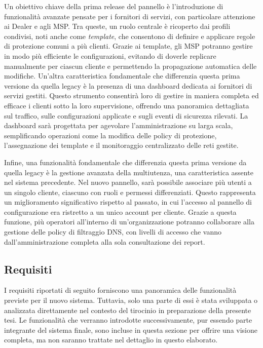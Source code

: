 Un obiettivo chiave della prima release del pannello è l'introduzione di funzionalità avanzate pensate per i fornitori di servizi, con particolare attenzione ai Dealer e agli MSP. Tra queste, un ruolo centrale è ricoperto dai profili condivisi, noti anche come \textit{template}, che consentono di definire e applicare regole di protezione comuni a più clienti. Grazie ai template, gli MSP potranno gestire in modo più efficiente le configurazioni, evitando di doverle replicare manualmente per ciascun cliente e permettendo la propagazione automatica delle modifiche.
%
Un'altra caratteristica fondamentale che differenzia questa prima versione da quella legacy è la presenza di una dashboard dedicata ai fornitori di servizi gestiti. Questo strumento consentirà loro di gestire in maniera completa ed efficace i clienti sotto la loro supervisione, offrendo una panoramica dettagliata sul traffico, sulle configurazioni applicate e sugli eventi di sicurezza rilevati. La dashboard sarà progettata per agevolare l’amministrazione su larga scala, semplificando operazioni come la modifica delle policy di protezione, l'assegnazione dei template e il monitoraggio centralizzato delle reti gestite.

Infine, una funzionalità fondamentale che differenzia questa prima versione da quella legacy è la gestione avanzata della multiutenza, una caratteristica assente nel sistema precedente. Nel nuovo pannello, sarà possibile associare più utenti a un singolo cliente, ciascuno con ruoli e permessi differenziati. Questo rappresenta un miglioramento significativo rispetto al passato, in cui l’accesso al pannello di configurazione era ristretto a un unico account per cliente. Grazie a questa funzione, più operatori all'interno di un'organizzazione potranno collaborare alla gestione delle policy di filtraggio DNS, con livelli di accesso che vanno dall'amministrazione completa alla sola consultazione dei report.

\subsection{Requisiti}
I requisiti riportati di seguito forniscono una panoramica delle funzionalità previste per il nuovo sistema. Tuttavia, solo una parte di essi è stata sviluppata o analizzata direttamente nel contesto del tirocinio in preparazione della presente tesi. Le funzionalità che verranno introdotte successivamente, pur essendo parte integrante del sistema finale, sono incluse in questa sezione per offrire una visione completa, ma non saranno trattate nel dettaglio in questo elaborato.

